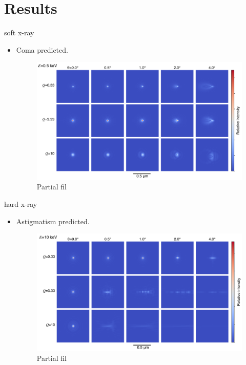 \documentclass{beamer}
\begin{document}
\section{Results}
\begin{frame}{soft x-ray}
	\begin{itemize}
		\item Coma predicted.
		\begin{center}
			\begin{figure}
				\includegraphics[scale=0.275]{foc_spot_half}
				\caption{Partial fil}	
			\end{figure}
		\end{center}
	\end{itemize}
\end{frame}

\begin{frame}{hard x-ray}
	\begin{itemize}
		\item Astigmatism predicted.
		\begin{center}
			\begin{figure}
				\includegraphics[scale=0.275]{foc_spot_ten}
				\caption{Partial fil}	
			\end{figure}
		\end{center}
	\end{itemize}
\end{frame}
\end{document}
